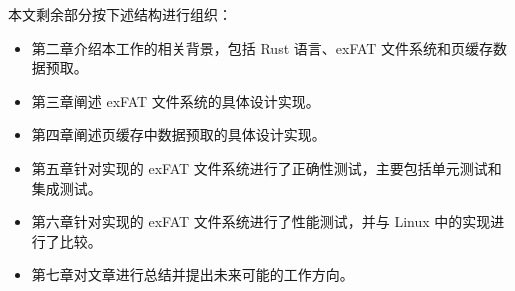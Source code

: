 本文剩余部分按下述结构进行组织：
\begin{itemize}
    \item 第二章介绍本工作的相关背景，包括 Rust 语言、exFAT 文件系统和页缓存数据预取。
    \item 第三章阐述 exFAT 文件系统的具体设计实现。
    \item 第四章阐述页缓存中数据预取的具体设计实现。
    \item 第五章针对实现的 exFAT 文件系统进行了正确性测试，主要包括单元测试和集成测试。
    \item 第六章针对实现的 exFAT 文件系统进行了性能测试，并与 Linux 中的实现进行了比较。
    \item 第七章对文章进行总结并提出未来可能的工作方向。
\end{itemize}




